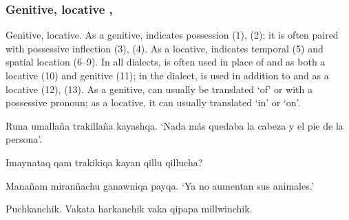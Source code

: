 {\subsubsection{Genitive, locative , }\label{ssec:genlocpa12}
Genitive, locative. As a genitive,  indicates possession (1), (2); it is often paired with possessive inflection (3), (4). As a locative,  indicates temporal (5) and spatial location (6--9).  In all dialects,  is often used in place of  and  as both a locative (10) and genitive (11); in the \CH{} dialect,  is used in addition to  and  as a locative (12), (13). As a genitive,  can usually be translated `of' or with a possessive pronoun; as a locative, it can usually translated `in' or `on'.

%
{Runa umalla\~na trakilla\~na kayashqa.}%
{}%
%
{`Nada m\'as quedaba la cabeza y el pie de la persona'.}%
{}{}%

%
{\textquestiondown{}Imaynataq qam trakikiqa kayan qillu qillucha?}%
{}%
{}{}%

%
{Mana\~nam miran\~nachu ganawniqa payqa.}%
{}%
%
{`Ya no aumentan sus animales.'}%
{}{}%

%
{Puchkanchik. Vakata harkanchik vaka qipapa millwinchik.}%
{}%
{}{}%

}
